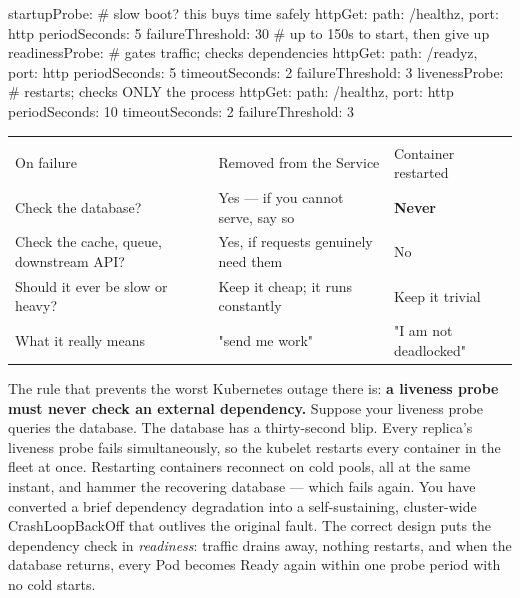 \begin{k8sbox}
          startupProbe:            # slow boot? this buys time safely
            httpGet: { path: /healthz, port: http }
            periodSeconds: 5
            failureThreshold: 30   # up to 150s to start, then give up
          readinessProbe:          # gates traffic; checks dependencies
            httpGet: { path: /readyz, port: http }
            periodSeconds: 5
            timeoutSeconds: 2
            failureThreshold: 3
          livenessProbe:           # restarts; checks ONLY the process
            httpGet: { path: /healthz, port: http }
            periodSeconds: 10
            timeoutSeconds: 2
            failureThreshold: 3
\end{k8sbox}

\begin{center}\small
\wbrowcolors
\begin{tabularx}{\linewidth}{@{}L{24mm} X X@{}}
 &  & \\
On failure & Removed from the Service & Container restarted\\
Check the database? & Yes --- if you cannot serve, say so & \textbf{Never}\\
Check the cache, queue, downstream API? & Yes, if requests genuinely need them & No\\
Should it ever be slow or heavy? & Keep it cheap; it runs constantly & Keep it trivial\\
What it really means & "send me work" & "I am not deadlocked"\\
\end{tabularx}
\end{center}

\begin{reliability}
The rule that prevents the worst Kubernetes outage there is: \textbf{a liveness probe must never check an external dependency.} Suppose your liveness probe queries the database. The database has a thirty-second blip. Every replica's liveness probe fails simultaneously, so the kubelet restarts every container in the fleet at once. Restarting containers reconnect on cold pools, all at the same instant, and hammer the recovering database --- which fails again. You have converted a brief dependency degradation into a self-sustaining, cluster-wide CrashLoopBackOff that outlives the original fault. The correct design puts the dependency check in \emph{readiness}: traffic drains away, nothing restarts, and when the database returns, every Pod becomes Ready again within one probe period with no cold starts.
\end{reliability}

